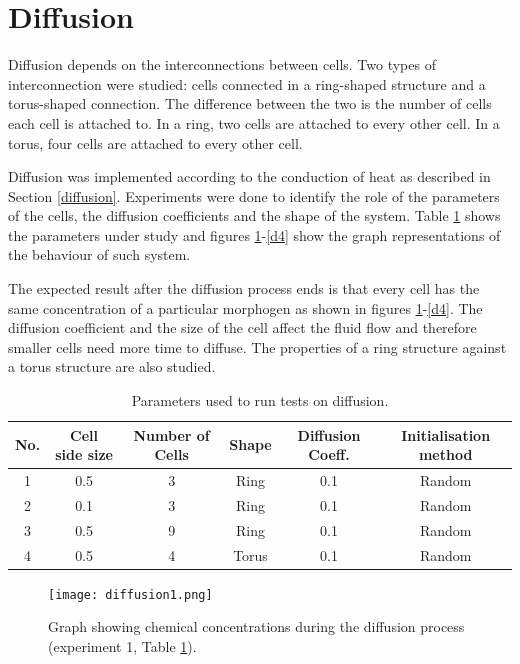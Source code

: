 \section{Diffusion}
Diffusion depends on the interconnections between cells. Two types of interconnection were studied: cells connected in a ring-shaped structure and a torus-shaped connection. The difference between the two is the number of cells each cell is attached to. In a ring, two cells are attached to every other cell. In a torus, four cells are attached to every other cell.

Diffusion was implemented according to the conduction of heat as described in Section \ref{diffusion}.
Experiments were done to identify the role of the parameters of the cells, the diffusion coefficients and the shape of the system. Table \ref{diffexp2} shows the parameters under study and figures \ref{d1}-\ref{d4} show the graph representations of the behaviour of such system.

The expected result after the diffusion process ends is that every cell has the same concentration of a particular morphogen as shown in figures \ref{d1}-\ref{d4}. The diffusion coefficient and the size of the cell affect the fluid flow and therefore smaller cells need more time to diffuse. The properties of a ring structure against a torus structure are also studied.

\begin{table}
\begin{center}
\caption{Parameters used to run tests on diffusion.}
\label{diffexp2}    
\begin{tabular}{| c | c | c | c | c | c |}
        \hline        
        No. & Cell side size & Number of Cells & Shape & Diffusion Coeff. & Initialisation method \\ \hline
        1 & 0.5 & 3 & Ring & 0.1 & Random \\ \hline
        2 & 0.1 & 3 & Ring & 0.1 & Random \\ \hline
        3 & 0.5 & 9 & Ring & 0.1 & Random \\ \hline
        4 & 0.5 & 4 & Torus & 0.1 & Random \\ \hline
    \end{tabular}
\end{center}
\end{table}

\begin{figure}
\centering
\texttt{[image: diffusion1.png]}
\caption{Graph showing chemical concentrations during the diffusion process (experiment 1, Table \ref{diffexp2}).}
\label{d1}
\end{figure}


